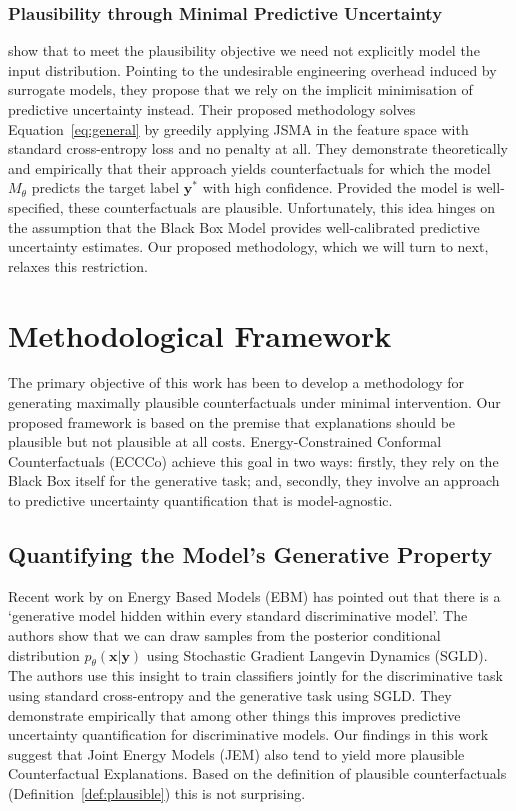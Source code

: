 \documentclass{article}
\begin{document}
\subsubsection{Plausibility through Minimal Predictive Uncertainty}

\citet{schut2021generating} show that to meet the plausibility objective we need not explicitly model the input distribution. Pointing to the undesirable engineering overhead induced by surrogate models, they propose that we rely on the implicit minimisation of predictive uncertainty instead. Their proposed methodology solves Equation~\ref{eq:general} by greedily applying JSMA in the feature space with standard cross-entropy loss and no penalty at all. They demonstrate theoretically and empirically that their approach yields counterfactuals for which the model $M_{\theta}$ predicts the target label $\mathbf{y}^*$ with high confidence. Provided the model is well-specified, these counterfactuals are plausible. Unfortunately, this idea hinges on the assumption that the Black Box Model provides well-calibrated predictive uncertainty estimates. Our proposed methodology, which we will turn to next, relaxes this restriction.

\section{Methodological Framework}\label{meth}

The primary objective of this work has been to develop a methodology for generating maximally plausible counterfactuals under minimal intervention. Our proposed framework is based on the premise that explanations should be plausible but not plausible at all costs. Energy-Constrained Conformal Counterfactuals (ECCCo) achieve this goal in two ways: firstly, they rely on the Black Box itself for the generative task; and, secondly, they involve an approach to predictive uncertainty quantification that is model-agnostic.

\subsection{Quantifying the Model's Generative Property}

Recent work by \citet{grathwohl2020your} on Energy Based Models (EBM) has pointed out that there is a `generative model hidden within every standard discriminative model'. The authors show that we can draw samples from the posterior conditional distribution $p_{\theta}(\mathbf{x}|\mathbf{y})$ using Stochastic Gradient Langevin Dynamics (SGLD). The authors use this insight to train classifiers jointly for the discriminative task using standard cross-entropy and the generative task using SGLD. They demonstrate empirically that among other things this improves predictive uncertainty quantification for discriminative models. Our findings in this work suggest that Joint Energy Models (JEM) also tend to yield more plausible Counterfactual Explanations. Based on the definition of plausible counterfactuals (Definition~\ref{def:plausible}) this is not surprising. 
\end{document}
